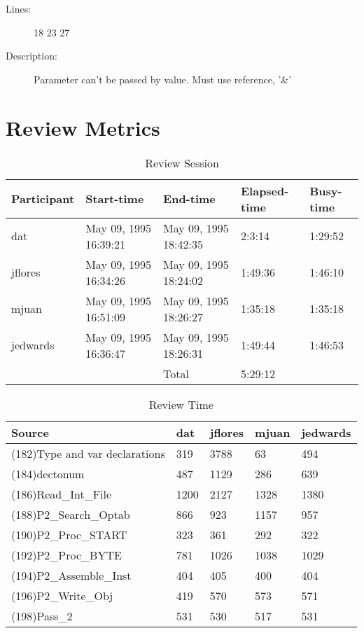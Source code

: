 \begin{enumerate}
\begin{description}
\item [Lines:] 18 23 27

\item [Description:] Parameter can't be passed by value.  Must use
reference, '\&'
\end{description}
\end{enumerate}
\section{Review Metrics}
\begin{table}[hb]
\begin{center}
\begin{tabular}{|l|l|l|l|l|}
\hline
Participant & Start-time & End-time & Elapsed-time & Busy-time \\
\hline
dat & May 09, 1995 16:39:21 & May 09, 1995 18:42:35 & 2:3:14 & 1:29:52 \\
jflores & May 09, 1995 16:34:26 & May 09, 1995 18:24:02 & 1:49:36 & 1:46:10 \\
mjuan & May 09, 1995 16:51:09 & May 09, 1995 18:26:27 & 1:35:18 & 1:35:18 \\
jedwards & May 09, 1995 16:36:47 & May 09, 1995 18:26:31 & 1:49:44 & 1:46:53 \\
\hline
 & & Total & 5:29:12 & \\
\hline
\end{tabular}
\end{center}
\caption{Review Session}
\end{table}


\begin{table}[hb]
\begin{center}
\begin{tabular}{|l|l|l|l|l|}
\hline
Source & dat & jflores & mjuan & jedwards\\
\hline
(182)Type and var declarations & 319 & 3788 & 63 & 494\\
(184)dectonum & 487 & 1129 & 286 & 639\\
(186)Read\_Int\_File & 1200 & 2127 & 1328 & 1380\\
(188)P2\_Search\_Optab & 866 & 923 & 1157 & 957\\
(190)P2\_Proc\_START & 323 & 361 & 292 & 322\\
(192)P2\_Proc\_BYTE & 781 & 1026 & 1038 & 1029\\
(194)P2\_Assemble\_Inst & 404 & 405 & 400 & 404\\
(196)P2\_Write\_Obj & 419 & 570 & 573 & 571\\
(198)Pass\_2 & 531 & 530 & 517 & 531\\
\hline
\end{tabular}
\end{center}
\caption{Review Time}
\end{table}

